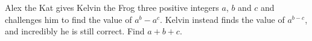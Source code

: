 Alex the Kat gives Kelvin the Frog three positive integers $a$, $b$ and $c$ and challenges him to find the value of $a^b-a^c$. Kelvin instead finds the value of $a^{b-c}$, and incredibly he is still correct. Find $a+b+c$.
